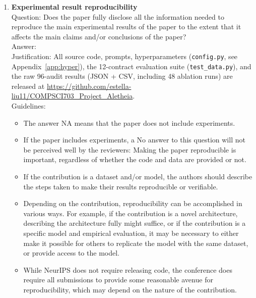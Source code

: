 \documentclass{article}
\begin{document}
\begin{enumerate}
\item {\bf Experimental result reproducibility}\\
Question: Does the paper fully disclose all the information needed to reproduce the main experimental results of the paper to the extent that it affects the main claims and/or conclusions of the paper?\\
Answer: \answerYes{}\\
Justification: All source code, prompts, hyperparameters (\texttt{config.py}, see Appendix~\ref{app:hyper}), the 12-contract evaluation suite (\texttt{test\_data.py}), and the raw 96-audit results (JSON + CSV, including 48 ablation runs) are released at \url{https://github.com/estella-liu11/COMPSCI703_Project_Aletheia}.\\
Guidelines:
\begin{itemize}
\item The answer NA means that the paper does not include experiments.
\item If the paper includes experiments, a No answer to this question will not be perceived well by the reviewers: Making the paper reproducible is important, regardless of whether the code and data are provided or not.
\item If the contribution is a dataset and/or model, the authors should describe the steps taken to make their results reproducible or verifiable.
\item Depending on the contribution, reproducibility can be accomplished in various ways. For example, if the contribution is a novel architecture, describing the architecture fully might suffice, or if the contribution is a specific model and empirical evaluation, it may be necessary to either make it possible for others to replicate the model with the same dataset, or provide access to the model.
\item While NeurIPS does not require releasing code, the conference does require all submissions to provide some reasonable avenue for reproducibility, which may depend on the nature of the contribution.
\end{itemize}


\end{enumerate}
\end{document}
